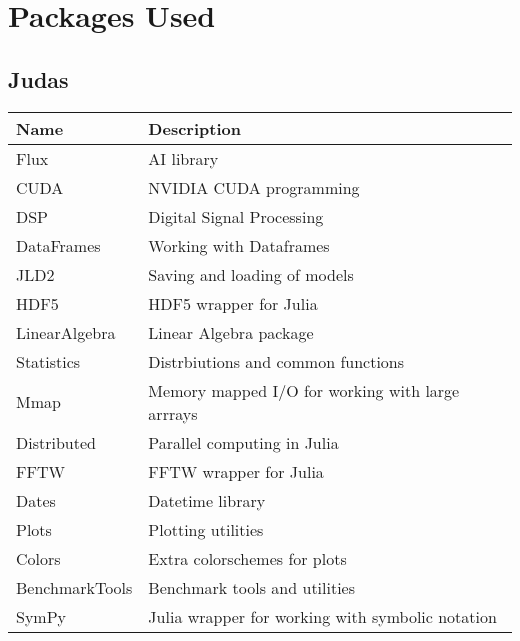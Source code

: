 \chapter{Packages Used}
\label{app:packages}

\section{Judas}
\label{app:jupacks}

\begin{table}[h]
\begin{tabular}{|l|l|}
\hline
\textbf{Name}  & \textbf{Description}                             \\ \hline
Flux           & AI library                                       \\ \hline
CUDA           & NVIDIA CUDA programming                          \\ \hline
DSP            & Digital Signal Processing                        \\ \hline
DataFrames     & Working with Dataframes                          \\ \hline
JLD2           & Saving and loading of models                     \\ \hline
HDF5           & HDF5 wrapper for Julia                           \\ \hline
LinearAlgebra  & Linear Algebra package                           \\ \hline
Statistics     & Distrbiutions and common functions               \\ \hline
Mmap           & Memory mapped I/O for working with large arrrays \\ \hline
Distributed    & Parallel computing in Julia                      \\ \hline
FFTW           & FFTW wrapper for Julia                           \\ \hline
Dates          & Datetime library                                 \\ \hline
Plots          & Plotting utilities                               \\ \hline
Colors         & Extra colorschemes for plots                     \\ \hline
BenchmarkTools & Benchmark tools and utilities                    \\ \hline
SymPy          & Julia wrapper for working with symbolic notation \\ \hline
\end{tabular}
\end{table}

